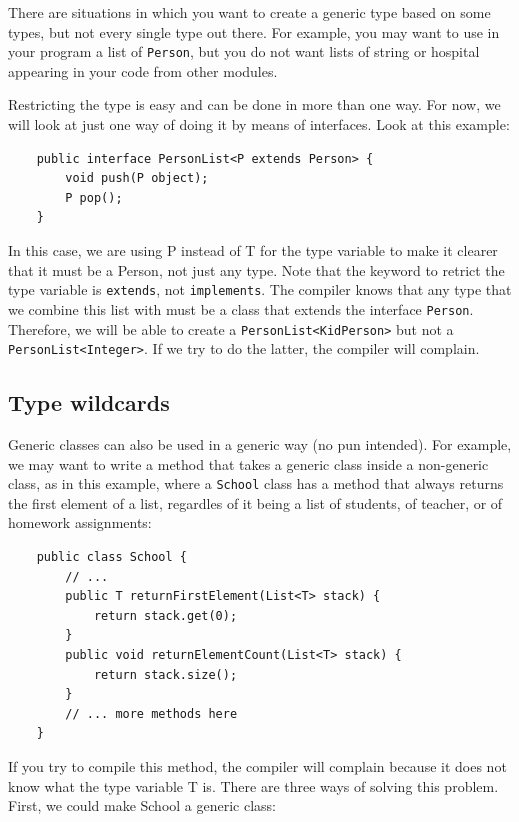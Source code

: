 There are situations in which you want to create a generic type based
on some types, but not every single type out there. For example, you
may want to use in your program a list of \verb+Person+, but you do
not want lists of string or hospital appearing in your code from other
modules. 

Restricting the type is easy and can be done in more than one way. For
now, we will look at just one way of doing it by means of
interfaces. Look at this example:

\begin{verbatim}
    public interface PersonList<P extends Person> {
        void push(P object);
        P pop();
    }
\end{verbatim}

In this case, we are using P instead of T for the type variable to
make it clearer that it must be a Person, not just any type. Note that
the keyword to retrict the type variable is \verb+extends+, not
\verb+implements+. The
compiler knows that any type that we combine this list with must be a
class that extends the interface \verb+Person+. Therefore, we will be
able to create a \verb+PersonList<KidPerson>+ but not a
\verb+PersonList<Integer>+. If we try to do the latter, the compiler will
complain. 

\subsection{Type wildcards}
\label{sec:type-wildcards}

Generic classes can also be used in a generic way (no pun
intended). For example, we may want to write a method that takes a
generic class inside a non-generic class, as in this example, where a
\verb+School+ class has a method that always returns the first element
of a list, regardles of it being a list of students, of teacher, or of
homework assignments: 

\begin{verbatim}
    public class School {
        // ...
        public T returnFirstElement(List<T> stack) {
            return stack.get(0); 
        }
        public void returnElementCount(List<T> stack) {
            return stack.size();
        }
        // ... more methods here
    }
\end{verbatim}

If you try to compile this method, the compiler will complain because
it does not know what the type variable T is. There are three ways of
solving this problem. First, we could make School a generic class: 

